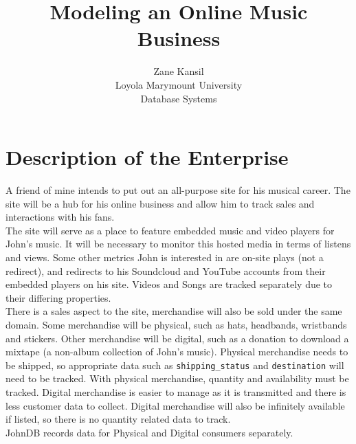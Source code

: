 \documentclass[11pt, a4paper]{report}
\title{Modeling an Online Music Business}
\author{Zane Kansil\\ Loyola Marymount University\\ Database Systems}
\providecommand\phantomsection{}
\begin{document}
\clearpage
\phantomsection
{}
\maketitle

\clearpage
\phantomsection
{}
\tableofcontents
\setcounter{page}{2}
\setcounter{chapter}{2}

\chapter{Description of the Enterprise}
A friend of mine intends to put out an all­-purpose site for his musical career. The site will be a hub for his online business and allow him to track sales and interactions with his fans.\\

The site will serve as a place to feature embedded music and video players for John's music. It will be necessary to monitor this hosted media in terms of listens and views. Some other metrics John is interested in are on­-site plays (not a redirect), and redirects to his Soundcloud and YouTube accounts from their embedded players on his site. Videos and Songs are tracked separately due to their differing properties.\\

There is a sales aspect to the site, merchandise will also be sold under the same domain. Some
merchandise will be physical, such as hats, headbands, wristbands and stickers. Other merchandise
will be digital, such as a donation to download a mixtape (a non-album collection of John's music). Physical merchandise needs to be shipped, so appropriate data such as \texttt{shipping\_status} and \texttt{destination} will need to be tracked. With physical merchandise, quantity and availability must be tracked. Digital merchandise is easier to manage as it is transmitted and there is less customer data to collect. Digital merchandise will also be
infinitely available if listed, so there is no quantity­ related data to track.\\

JohnDB records data for Physical and Digital consumers separately.\\
\end{document}
